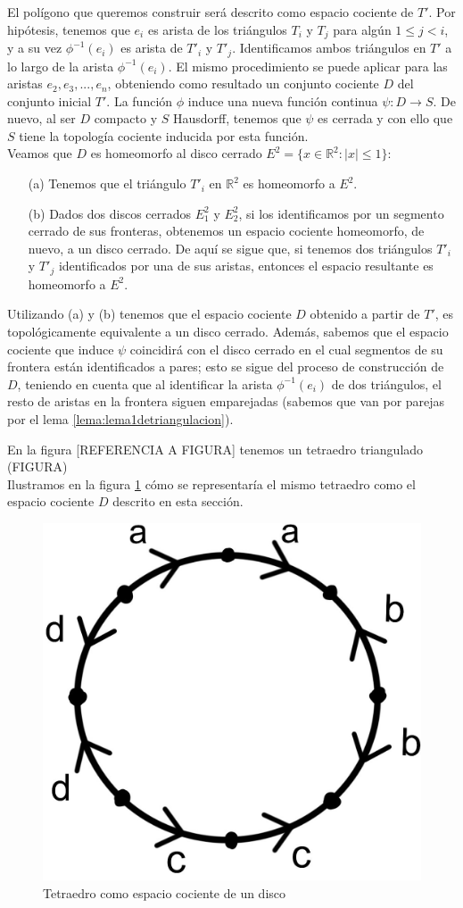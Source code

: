 \documentclass[a4paper,11pt,spanish, twoside, leqno]{tfg-uam}
\newcommand*{\reales}{\mathbb{R}}
\theoremstyle{definition}
\begin{document}
El polígono que queremos construir será descrito como espacio cociente de $T'$. Por hipótesis, tenemos que $e_i$ es arista de los triángulos $T_i$ y $T_j$ para algún $1\leq j < i$, y a su vez $\phi^{-1}(e_i)$ es arista de $T'_i$ y $T'_j$. Identificamos ambos triángulos en $T'$ a lo largo de la arista $\phi^{-1}(e_i)$. El mismo procedimiento se puede aplicar para las aristas $e_2, e_3, ..., e_n$, obteniendo como resultado un conjunto cociente $D$ del conjunto inicial $T'$. La función $\phi$ induce una nueva función continua $\psi: D \longrightarrow S$. De nuevo, al ser $D$ compacto y $S$ Hausdorff, tenemos que $\psi$ es   cerrada y con ello que $S$ tiene la topología cociente inducida por esta función. \\
Veamos que $D$ es homeomorfo al disco cerrado $E^2 = \{x\in \reales^2: |x|\leq 1\}$:
\begin{enumerate}
\item[(a)] Tenemos que el triángulo $T'_i$ en $\reales^2$ es homeomorfo a $E^2$.
\item[(b)] Dados dos discos cerrados $E^2_1$ y $E^2_2$, si los identificamos por un segmento cerrado de sus fronteras, obtenemos un espacio cociente homeomorfo, de nuevo, a un disco cerrado. De aquí se sigue que, si tenemos dos triángulos $T'_i$ y $T'_j$  identificados por una de sus aristas, entonces el espacio resultante es homeomorfo a $E^2$.
\end{enumerate}
Utilizando (a) y (b) tenemos que el espacio cociente $D$ obtenido a partir de $T'$, es topológicamente equivalente a un disco cerrado. Además, sabemos que el espacio cociente que induce $\psi$ coincidirá  con el disco cerrado en el cual segmentos de su frontera están identificados a pares; esto se sigue del proceso de construcción de $D$, teniendo en cuenta que al identificar la arista $\phi^{-1}(e_i)$ de dos triángulos, el resto de aristas en la frontera siguen emparejadas (sabemos que van por parejas por el lema \ref{lema:lema1detriangulacion}).


En la figura [REFERENCIA A FIGURA] tenemos un tetraedro triangulado\\
(FIGURA)\\
Ilustramos en la figura \ref{fig:d} cómo se representaría el mismo tetraedro como el espacio cociente $D$ descrito en esta sección.

\begin{figure}[h!]
			\centering
			\includegraphics[width=0.3\linewidth]{imagenes/d.jpeg}
			\caption{Tetraedro como espacio cociente de un disco}
			\label{fig:d}
		\end{figure}
\end{document}
